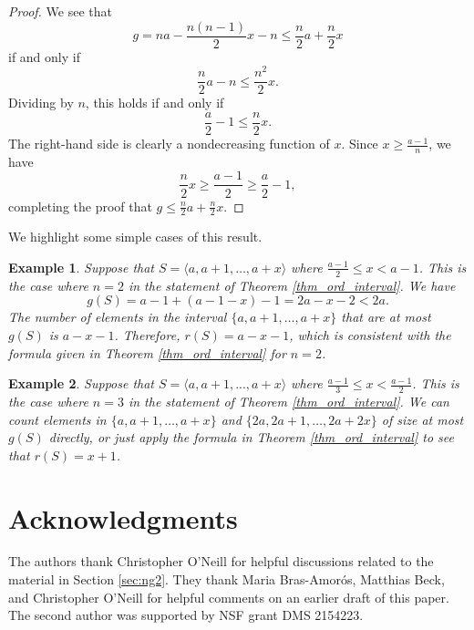 \documentclass[12pt]{amsart}
\theoremstyle{plain}\newtheorem{proposition}{Proposition}[section]
\newtheorem{example}[proposition]{Example}
\begin{document}
\begin{proof}
We see that 
\[
g = na - \frac{n(n-1)}{2} x - n \le 
 \frac{n}{2} a + \frac{n}{2} x
\]
if and only if 
\[
\frac{n}{2} a - n \le \frac{n^2}{2} x.
\]
Dividing by $n$, this holds if and only if 
\[
\frac{a}{2} - 1 \le \frac{n}{2} x.
\]
The right-hand side is clearly a nondecreasing function of $x$.  Since $x \ge \frac{a-1}{n}$, we have 
\[
\frac{n}{2} x \ge \frac{a-1}{2}  \ge \frac{a}{2}  - 1,
\]
completing the proof that $g \le \frac{n}{2} a + \frac{n}{2} x$.
\end{proof}

We highlight some simple cases of this result.
\begin{example}
Suppose that $S = \langle a,a+1,\ldots, a+x\rangle$ where $\frac{a-1}{2}\le x < a-1$.  This is the case where $n = 2$ in the statement of Theorem \ref{thm_ord_interval}. We have 
\[
g(S) = a-1 + (a-1-x)-1 = 2a-x-2 < 2a.
\]  
The number of elements in the interval $\{a,a+1,\ldots, a+x\}$ that are at most $g(S)$ is $a-x-1$.  Therefore, $r(S) = a-x-1$, which is consistent with the formula given in Theorem \ref{thm_ord_interval} for $n=2$.  
\end{example}

\begin{example}
Suppose that $S=\langle a,a+1,...,a+x\rangle$ where $\frac{a-1}{3}\leq x< \frac{a-1}{2}$. This is the case where $n=3$ in the statement of Theorem \ref{thm_ord_interval}.  We can count elements in $\{a,a+1,\ldots, a+x\}$ and $\{2a,2a+1,\ldots, 2a+2x\}$ of size at most $g(S)$ directly, or just apply the formula in Theorem \ref{thm_ord_interval} to see that $r(S) = x+1$.
\end{example}

\section*{Acknowledgments}
The authors thank Christopher O'Neill for helpful discussions related to the material in Section \ref{sec:ng2}.  They thank Maria Bras-Amor\'os, Matthias Beck, and Christopher O'Neill for helpful comments on an earlier draft of this paper.  The second author was supported by NSF grant DMS 2154223.
\end{document}
